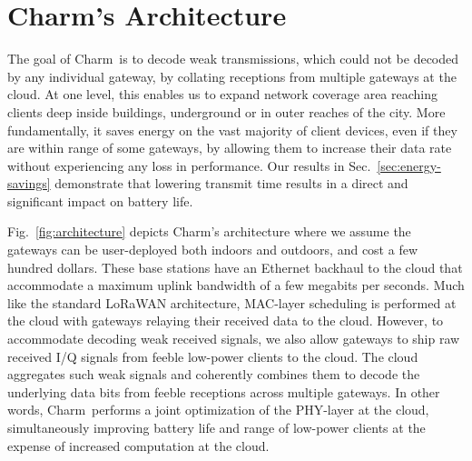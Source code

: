 \section{Charm's Architecture}
\label{sec:arch}



The goal of Charm\ is to decode weak transmissions, which could not be
decoded by any individual gateway, by collating receptions from multiple
gateways at the cloud. At one level, this  enables us to expand network coverage area reaching clients deep inside buildings, underground or in outer reaches of the city. More fundamentally, it saves energy on the vast majority of client devices, even if they are within range of some gateways, by allowing them to increase their data rate without experiencing any loss in performance. Our results in Sec.~\ref{sec:energy-savings} demonstrate that lowering transmit time results in a direct and significant impact on battery life. 

Fig.~\ref{fig:architecture} depicts Charm's architecture where we assume the gateways can be user-deployed  both indoors and outdoors, and cost a few hundred dollars. These base stations have an Ethernet backhaul to the cloud that accommodate a maximum uplink bandwidth of a few megabits per seconds. Much like the standard LoRaWAN architecture, MAC-layer scheduling is performed at the cloud with gateways relaying their received data to the cloud. However, to accommodate decoding weak received signals, we also allow gateways to ship raw received I/Q signals from feeble low-power clients to the cloud. The cloud aggregates such weak signals and coherently combines them to decode the underlying data bits from feeble receptions across multiple gateways. In other words, Charm\ performs a joint optimization of the  PHY-layer at the cloud, simultaneously improving battery life and range of low-power clients at the expense of increased computation at the cloud. 

